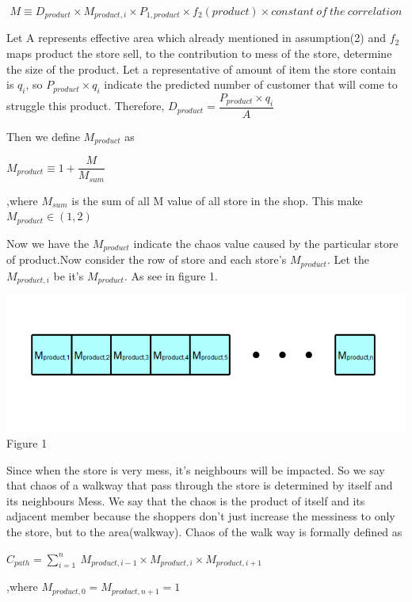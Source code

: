 \[M \equiv D_{product} \times M_{product,i}\times P_{1,product} \times f_2 (product)\times constant\ of\ the\ correlation\]

Let A represents effective area which already mentioned in assumption(2) and $f_2$ maps product the store sell, to the contribution to mess of the store, determine the size of the product. Let a representative of amount of item the store contain is $q_i$, so $P_{product} \times q_i$ indicate the predicted number of customer that will come to struggle this product. 
\medskip Therefore, $D_{product}=\dfrac{P_{product} \times q_i}{A}$

Then we define $M_{product}$ as 
\begin{definition}
$M_{product} \equiv 1+ \dfrac{M}{M_{sum}}$
\end{definition}
,where $M_{sum}$ is the sum of all M value of all store in the shop.
This make $M_{product}\in (1,2)$

Now we have the $M_{product}$ indicate the chaos value caused by the particular store of product.Now consider the row of store and each store's $M_{product}$. Let the $M_{product,i}$ be it's $M_{product}$. As see in figure 1.
\begin{center}
\includegraphics[width=\textwidth]{fig3.PNG}
Figure 1
\end{center}


Since when the store is very mess, it's neighbours will be impacted. So we say that chaos of a walkway that pass through the store is determined by itself and its neighbours Mess. We say that the chaos is the product of itself and its adjacent member because the shoppers don't just increase the messiness to only the store, but to the area(walkway). Chaos of the walk way is formally defined as

\begin{model}
    $C_{path}=\displaystyle{\sum_{i=1}^{n}\ M_{product,i-1}\times M_{product,i}\times M_{product,i+1} }$
\end{model}
,where $M_{product,0}=M_{product,n+1}=1$

